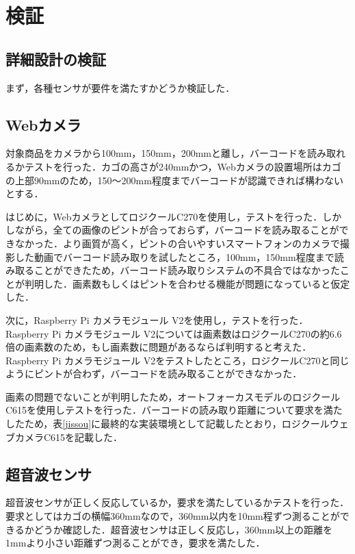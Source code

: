

\section{検証}


\subsection{詳細設計の検証}

まず，各種センサが要件を満たすかどうか検証した．

\subsection*{Webカメラ}

対象商品をカメラから100mm，150mm，200mmと離し，バーコードを読み取れるかテストを行った．カゴの高さが240mmかつ，Webカメラの設置場所はカゴの上部90mmのため，150～200mm程度までバーコードが認識できれば構わないとする．

はじめに，WebカメラとしてロジクールC270を使用し，テストを行った．しかしながら，全ての画像のピントが合っておらず，バーコードを読み取ることができなかった．より画質が高く，ピントの合いやすいスマートフォンのカメラで撮影した動画でバーコード読み取りを試したところ，100mm，150mm程度まで読み取ることができたため，バーコード読み取りシステムの不具合ではなかったことが判明した．画素数もしくはピントを合わせる機能が問題になっていると仮定した．

次に，Raspberry Pi カメラモジュール V2を使用し，テストを行った．Raspberry Pi カメラモジュール V2については画素数はロジクールC270の約6.6倍の画素数のため，もし画素数に問題があるならば判明すると考えた．Raspberry Pi カメラモジュール V2をテストしたところ，ロジクールC270と同じようにピントが合わず，バーコードを読み取ることができなかった．

画素の問題でないことが判明したため，オートフォーカスモデルのロジクールC615を使用しテストを行った．バーコードの読み取り距離について要求を満たしたため，表\ref{jissou}に最終的な実装環境として記載したとおり，ロジクールウェブカメラC615を記載した．

\subsection*{超音波センサ}

超音波センサが正しく反応しているか，要求を満たしているかテストを行った．要求としてはカゴの横幅360mmなので，360mm以内を10mm程ずつ測ることができるかどうか確認した．超音波センサは正しく反応し，360mm以上の距離を1mmより小さい距離ずつ測ることができ，要求を満たした．

